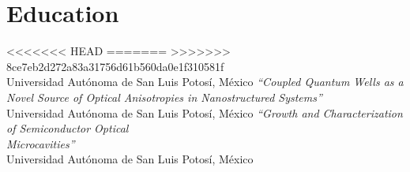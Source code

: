 \documentclass[letterpaper,dvipsnames]{twentysecondcv} %
\begin{document}

\aboutme{} %







\makeprofile %



\section{Education}

\begin{twenty} %
<<<<<<< HEAD
=======
>>>>>>> 8ce7eb2d272a83a31756d61b560da0e1f310581f
	                       {\\Universidad Aut\'onoma de San Luis Potos\'i, M\'exico}
	                       {\emph{``Coupled Quantum Wells as a Novel Source of Optical Anisotropies in
						   Nanostructured Systems''}}
	                      {\\Universidad Aut\'onoma de San Luis Potos\'i, M\'exico}
	                      {\emph{``Growth and Characterization of Semiconductor Optical \\ Microcavities''}}
	                      {\\Universidad Aut\'onoma de San Luis Potos\'i, M\'exico}
	                      {}
	
\end{twenty}
\end{document}
